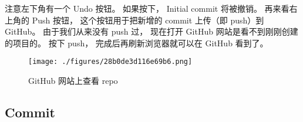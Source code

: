 注意左下角有一个 Undo 按钮。 如果按下， Initial commit 将被撤销。 再来看右上角的 Push 按钮， 这个按钮用于把新增的 commit 上传（即 push）到 GitHub。 由于我们从来没有 push 过， 现在打开 GitHub 网站是看不到刚刚创建的项目的。 按下 push， 完成后再刷新浏览器就可以在 GitHub 看到了。
\begin{figure}[ht]
\centering
\texttt{[image: ./figures/28b0de3d116e69b6.png]}
\caption{GitHub 网站上查看 repo} \label{fig_GitHub_5}
\end{figure}

\subsection{Commit}
